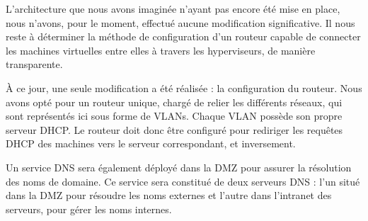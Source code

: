 \documentclass[file.tex]{subfiles}
\begin{document}
L'architecture que nous avons imaginée n'ayant pas encore été mise en place, nous n'avons, pour le moment, effectué aucune modification significative. Il nous reste à déterminer la méthode de configuration d'un routeur capable de connecter les machines virtuelles entre elles à travers les hyperviseurs, de manière transparente.

\vspace{1em} %

À ce jour, une seule modification a été réalisée : la configuration du routeur. Nous avons opté pour un routeur unique, chargé de relier les différents réseaux, qui sont représentés ici sous forme de VLANs. Chaque VLAN possède son propre serveur DHCP. Le routeur doit donc être configuré pour rediriger les requêtes DHCP des machines vers le serveur correspondant, et inversement.

\vspace{1em}

Un service DNS sera également déployé dans la DMZ pour assurer la résolution des noms de domaine. Ce service sera constitué de deux serveurs DNS : l'un situé dans la DMZ pour résoudre les noms externes et l'autre dans l'intranet des serveurs, pour gérer les noms internes.
\end{document}

